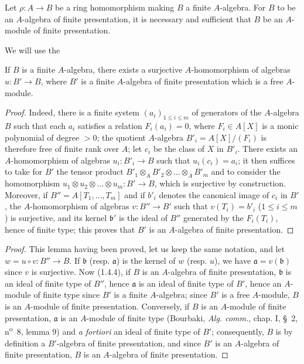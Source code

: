 \begin{proposition}[1.4.7]
\label{IV.1.4.7}
Let $\rho:A\to B$ be a ring homomorphism making $B$ a finite
$A$-algebra. For $B$ to be an $A$-algebra of finite presentation, it is
necessary and sufficient that $B$ be an $A$-module of finite presentation.
\end{proposition}

We will use the

\begin{lemma}[1.4.7.1]
\label{IV.1.4.7.1}
If $B$ is a finite $A$-algebra, there exists a surjective $A$-homomorphism
of algebras $u:B'\to B$, where $B'$ is a finite $A$-algebra of finite
presentation which is a free $A$-module.
\end{lemma}

\begin{proof}
Indeed, there is a finite system $(a_i)_{1\leq i\leq m}$ of generators of the
$A$-algebra $B$ such that each $a_i$ satisfies a relation $F_i(a_i)=0$, where
$F_i\in A[X]$ is a monic polynomial of degree $>0$; the quotient $A$-algebra
$B'_i=A[X]/(F_i)$ is therefore free of finite rank over $A$; let $c_i$ be the
class of $X$ in $B'_i$. There exists an $A$-homomorphism of algebras
$u_i:B'_i\to B$ such that $u_i(c_i)=a_i$; it then suffices to take for $B'$
the tensor product $B'_1\otimes_AB'_2\otimes\ldots\otimes_AB'_m$ and to
consider the homomorphism $u_1\otimes u_2\otimes\ldots\otimes u_m:B'\to B$,
which is surjective by construction. Moreover, if $B''=A[T_1,\ldots,T_m]$
and if $b'_i$ denotes the canonical image of $c_i$ in $B'$, the
$A$-homomorphism of algebras $v:B''\to B'$ such that $v(T_i)=b'_i$
($1\leq i\leq m$) is surjective, and its kernel $\mathfrak b'$ is the ideal
of $B''$ generated by the $F_i(T_i)$, hence of finite type; this proves that
$B'$ is an $A$-algebra of finite presentation.
\end{proof}

\begin{proof}
This lemma having been proved, let us keep the same notation, and let
$w=u\circ v:B''\to B$. If $\mathfrak b$ (resp. $\mathfrak a$) is the kernel of
$w$ (resp. $u$), we have $\mathfrak a=v(\mathfrak b)$ since $v$ is
surjective. Now (1.4.4), if $B$ is an $A$-algebra of finite presentation,
$\mathfrak b$ is an ideal of finite type of $B''$, hence $\mathfrak a$ is an
ideal of finite type of $B'$, hence an $A$-module of finite type since $B'$ is
a finite $A$-algebra; since $B'$ is a free $A$-module, $B$ is an $A$-module of
finite presentation. Conversely, if $B$ is an $A$-module of finite
presentation, $\mathfrak a$ is an $A$-module of finite type (Bourbaki,
\emph{Alg. comm.}, chap. I, \S~2, n\textsuperscript{o}~8, lemma 9) and
\emph{a fortiori} an ideal of finite type of $B'$; consequently, $B$ is by
definition a $B'$-algebra of finite presentation, and since $B'$ is an
$A$-algebra of finite presentation, $B$ is an $A$-algebra of finite
presentation.
\end{proof}

